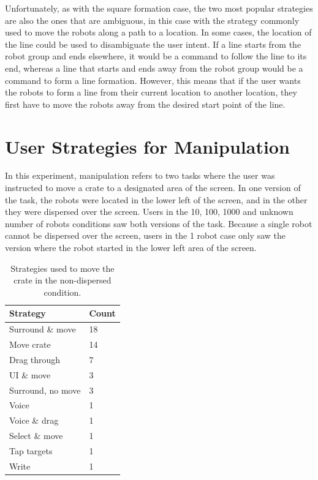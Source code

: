 Unfortunately, as with the square formation case, the two most popular strategies are also the ones that are ambiguous, in this case with the strategy commonly used to move the robots along a path to a location. 
In some cases, the location of the line could be used to disambiguate the user intent. 
If a line starts from the robot group and ends elsewhere, it would be a command to follow the line to its end, whereas a line that starts and ends away from the robot group would be a command to form a line formation. 
However, this means that if the user wants the robots to form a line from their current location to another location, they first have to move the robots away from the desired start point of the line. 

\section{User Strategies for Manipulation}

In this experiment, manipulation refers to two tasks where the user was instructed to move a crate to a designated area of the screen. 
In one version of the task, the robots were located in the lower left of the screen, and in the other they were dispersed over the screen. 
Users in the 10, 100, 1000 and unknown number of robots conditions saw both versions of the task. 
Because a single robot cannot be dispersed over the screen, users in the 1 robot case only saw the version where the robot started in the lower left area of the screen. 

\begin{table}
	\begin{tabular}{l l}
		Strategy & Count\\
		\hline
		Surround \& move & 18\\
		Move crate & 14\\
		Drag through & 7\\
		UI \& move & 3\\
		Surround, no move & 3\\
		Voice & 1\\
		Voice \& drag & 1\\
		Select \& move & 1 \\
		Tap targets & 1\\
		Write & 1\\
	\end{tabular}
	\caption{Strategies used to move the crate in the non-dispersed condition.}
	\label{tab:crate_strategies}
\end{table}

